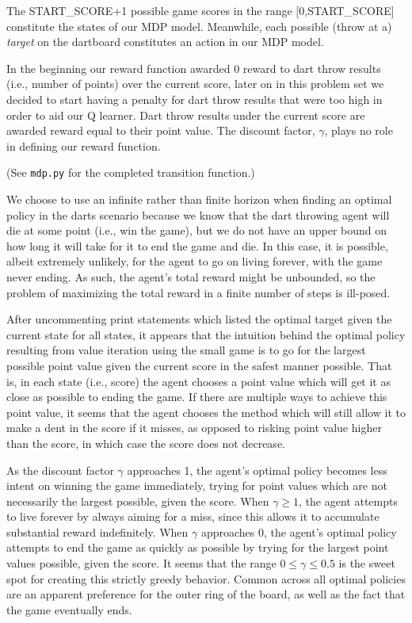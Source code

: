 \documentclass[solution, letterpaper]{cs121}
\begin{document}
\pagebreak


\subproblem{} %
The \textsc{START\_SCORE}+1 possible game scores in the range [0,\textsc{START\_SCORE}] constitute the states of our MDP model. Meanwhile, each possible (throw at a) \emph{target} on the dartboard constitutes an action in our MDP model.

\subproblem{} %
In the beginning our reward function awarded 0 reward to dart throw results (i.e., number of points) over the current score, later on in this problem set we decided to start having a penalty for dart throw results that were too high in order to aid our Q learner. Dart throw results under the current score are awarded reward equal to their point value. The discount factor, $\gamma$, plays no role in defining our reward function.

\subproblem{} %
(See {\tt mdp.py} for the completed transition function.)

\subproblem{} %
We choose to use an infinite rather than finite horizon when finding an optimal policy in the darts scenario because we know that the dart throwing agent will die at some point (i.e., win the game), but we do not have an upper bound on how long it will take for it to end the game and die. In this case, it is possible, albeit extremely unlikely, for the agent to go on living forever, with the game never ending. As such, the agent's total reward might be unbounded, so the problem of maximizing the total reward in a finite number of steps is ill-posed.

\subproblem{} %
After uncommenting print statements which listed the optimal target given the current state for all states, it appears that the intuition behind the optimal policy resulting from value iteration using the small game is to go for the largest possible point value given the current score in the safest manner possible. That is, in each state (i.e., score) the agent chooses a point value which will get it as close as possible to ending the game. If there are multiple ways to achieve this point value, it seems that the agent chooses the method which will still allow it to make a dent in the score if it misses, as opposed to risking point value higher than the score, in which case the score does not decrease.

\subproblem{} %
As the discount factor $\gamma$ approaches 1, the agent's optimal policy becomes less intent on winning the game immediately, trying for point values which are not necessarily the largest possible, given the score. When $\gamma \geq 1$, the agent attempts to live forever by always aiming for a miss, since this allows it to accumulate substantial reward indefinitely. When $\gamma$ approaches 0, the agent's optimal policy attempts to end the game as quickly as possible by trying for the largest point values possible, given the score. It seems that the range $0 \leq \gamma \leq 0.5$ is the sweet
%  
spot for creating this strictly greedy behavior. Common across all optimal policies are an apparent preference for the outer ring of the board, as well as the fact that the game eventually ends.
\end{document}
